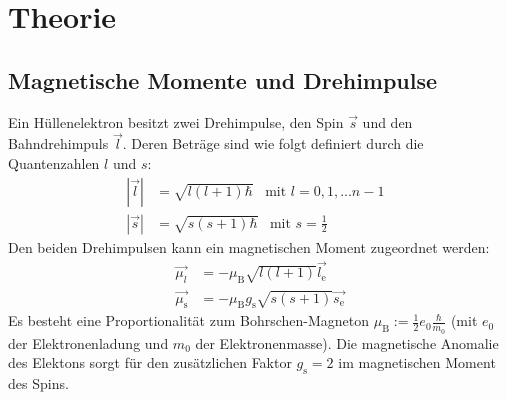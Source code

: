\section{Theorie}
\label{sec:Theorie}
\subsection{Magnetische Momente und Drehimpulse}
Ein Hüllenelektron besitzt zwei Drehimpulse, den Spin $\vec{s}$ und den Bahndrehimpuls $\vec{l}$.
Deren Beträge sind wie folgt definiert durch die Quantenzahlen $\textit{l}$ und $s$:
\begin{align}
  |\vec{l}|&=\sqrt{\textit{l}(\textit{l}+1)\hbar}\,\,\,\,\,\text{mit $\textit{l}=0,1,...n-1$ }\\
  |\vec{s}|&=\sqrt{s(s+1)\hbar}\,\,\,\,\,\text{mit $s=\frac{1}{2}$}\
\end{align}
Den beiden Drehimpulsen kann ein magnetischen Moment zugeordnet werden:
\begin{align}
  \vec{\mu_\mathrm{\textit{l}}}&=-\mu_\mathrm{B}\sqrt{\textit{l}(\textit{l}+1)}\vec{\textit{l}_\mathrm{e}}\\
  \vec{\mu_\mathrm{s}}&=-\mu_\mathrm{B} g_\mathrm{s}\sqrt{s(s+1)}\vec{s_\mathrm{e}}
\end{align}
Es besteht eine Proportionalität zum Bohrschen-Magneton $\mu_\mathrm{B}:=\frac{1}{2}e_\mathrm{0}\frac{\hbar}{m_\mathrm{0}}$
(mit $e_\mathrm{0}$ der Elektronenladung und $m_\mathrm{0}$ der Elektronenmasse).
Die magnetische Anomalie des Elektons sorgt für den zusätzlichen Faktor $g_\mathrm{s}=2$
im magnetischen Moment des Spins.

